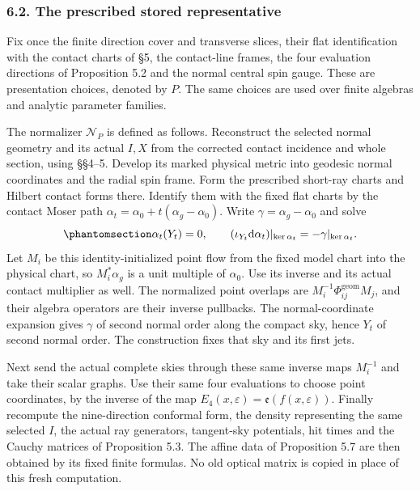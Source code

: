 \documentclass[
  english,
  11pt,
  reqno]{amsart}
\begin{document}
\protect{}\label{sec:gg-prescribed-normalizer}

\subsubsection{6.2. The prescribed stored
representative}\label{the-prescribed-stored-representative}

Fix once the finite direction cover and transverse slices, their flat
identification with the contact charts of §5, the contact-line frames,
the four evaluation directions of Proposition 5.2 and the normal central
spin gauge. These are presentation choices, denoted by \(P\). The same
choices are used over finite algebras and analytic parameter families.

The normalizer \(\mathcal N_P\) is defined as follows. Reconstruct the
selected normal geometry and its actual \(I,X\) from the corrected
contact incidence and whole section, using §§4--5. Develop its marked
physical metric into geodesic normal coordinates and the radial spin
frame. Form the prescribed short-ray charts and Hilbert contact forms
there. Identify them with the fixed flat charts by the contact Moser
path \(\alpha_t=\alpha_0+t(\alpha_g-\alpha_0)\). Write
\(\gamma=\alpha_g-\alpha_0\) and solve
\begin{equation}\protect\phantomsection\label{eq:gg-defined-contact-moser}{
 \alpha_t(Y_t)=0,\qquad
 (\iota_{Y_t}\mathrm d\alpha_t)|_{\ker\alpha_t}
                          =-\gamma|_{\ker\alpha_t}.
}\end{equation} Let \(M_i\) be this identity-initialized point flow from
the fixed model chart into the physical chart, so \(M_i^*\alpha_g\) is a
unit multiple of \(\alpha_0\). Use its inverse and its actual contact
multiplier as well. The normalized point overlaps are
\(M_i^{-1}\Phi_{ij}^{\mathrm{geom}}M_j\), and their algebra operators
are their inverse pullbacks. The normal-coordinate expansion gives
\(\gamma\) of second normal order along the compact sky, hence \(Y_t\)
of second normal order. The construction fixes that sky and its first
jets.

Next send the actual complete skies through these same inverse maps
\(M_i^{-1}\) and take their scalar graphs. Use their same four
evaluations to choose point coordinates, by the inverse of the map
\(E_4(x,\varepsilon)=\mathfrak e(f(x,\varepsilon))\). Finally recompute
the nine-direction conformal form, the density representing the same
selected \(I\), the actual ray generators, tangent-sky potentials, hit
times and the Cauchy matrices of Proposition 5.3. The affine data of
Proposition 5.7 are then obtained by its fixed finite formulas. No old
optical matrix is copied in place of this fresh computation.
\end{document}
